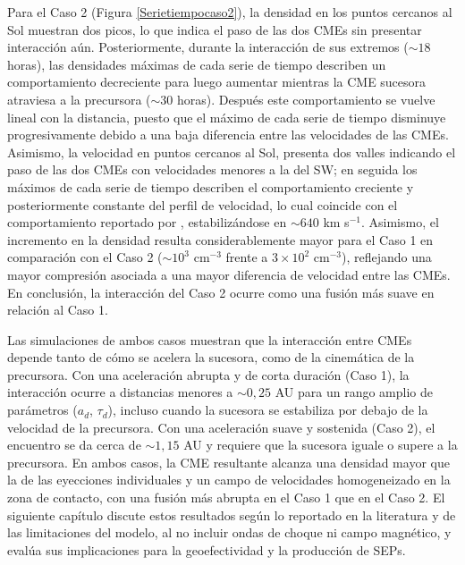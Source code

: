 Para el Caso 2 (Figura \ref{Serietiempocaso2}), la densidad en los puntos cercanos al Sol muestran dos picos, lo que indica el paso de las dos CMEs sin presentar interacción aún. Posteriormente, durante la interacción de sus extremos ($\sim 18$ horas), las densidades máximas de cada serie de tiempo describen un comportamiento decreciente para luego aumentar mientras la CME sucesora atraviesa a la precursora ($\sim30$ horas). Después este comportamiento se vuelve lineal con la distancia, puesto que el máximo de cada serie de tiempo disminuye progresivamente debido a una baja diferencia entre las velocidades de las CMEs. Asimismo, la velocidad en puntos cercanos al Sol, presenta dos valles indicando el paso de las dos CMEs con velocidades menores a la del \ac{SW}; en seguida los máximos de cada serie de tiempo describen el comportamiento creciente y posteriormente constante del perfil de velocidad, lo cual coincide con el comportamiento reportado por \textcite[e.g.,][]{gallagher-2003}, estabilizándose en $\sim640$ km s$^{-1}$. Asimismo, el incremento en la densidad resulta considerablemente mayor para el Caso 1 en comparación con el Caso 2 ($\sim10^3$ cm$^{-3}$ frente a $3\times10^{2}$ cm$^{-3}$), reflejando una mayor compresión asociada a una mayor diferencia de velocidad entre las CMEs. En conclusión, la interacción del Caso 2 ocurre como una fusión más suave en relación al Caso 1.

Las simulaciones de ambos casos muestran que la interacción entre CMEs depende tanto de cómo se acelera la sucesora, como de la cinemática de la precursora. Con una aceleración abrupta y de corta duración (Caso 1), la interacción ocurre a distancias menores a $\sim0{,}25$ AU para un rango amplio de parámetros ($a_d$, $\tau_d$), incluso cuando la sucesora se estabiliza por debajo de la velocidad de la precursora. Con una aceleración suave y sostenida (Caso 2), el encuentro se da cerca de $\sim1{,}15$ AU y requiere que la sucesora iguale o supere a la precursora. En ambos casos, la CME resultante alcanza una densidad mayor que la de las eyecciones individuales y un campo de velocidades homogeneizado en la zona de contacto, con una fusión más abrupta en el Caso 1 que en el Caso 2. El siguiente capítulo discute estos resultados según lo reportado en la literatura y de las limitaciones del modelo, al no incluir ondas de choque ni campo magnético, y evalúa sus implicaciones para la geoefectividad y la producción de \acp{SEP}.